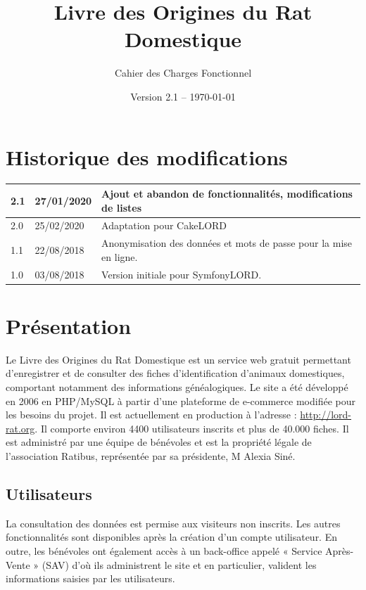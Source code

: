 \documentclass[a4paper,10pt]{article}
\title{Livre des Origines du Rat Domestique}
\author{Cahier des Charges Fonctionnel}
\date{Version 2.1 -- \today}
\begin{document}
\maketitle

\section*{Historique des modifications}

\large
\noindent\begin{tabularx}{\textwidth}{|l|l|X|}\hline
\textbf{2.1} & \textbf{27/01/2020} & \textbf{Ajout et abandon de fonctionnalités, modifications de listes}\\\hline
2.0 & 25/02/2020 & Adaptation pour CakeLORD\\\hline
1.1 & 22/08/2018 & Anonymisation des données et mots de passe pour la mise en ligne.\\\hline
1.0 & 03/08/2018 & Version initiale pour SymfonyLORD.\\\hline
\end{tabularx}
\normalsize

\vfill

\tableofcontents

\section{Présentation}
Le Livre des Origines du Rat Domestique est un service web gratuit permettant d'enregistrer et de consulter des fiches d'identification d'animaux domestiques, comportant notamment des informations généalogiques. Le site a été développé en 2006 en PHP/MySQL à partir d'une plateforme de e-commerce modifiée pour les besoins du projet. Il est actuellement en production à l'adresse : \url{http://lord-rat.org}. Il comporte environ 4400 utilisateurs inscrits et plus de 40.000 fiches. Il est administré par une équipe de bénévoles et est la propriété légale de l'association Ratibus, représentée par sa présidente, M Alexia Siné.

\subsection{Utilisateurs}
La consultation des données est permise aux visiteurs non inscrits. Les autres fonctionnalités sont disponibles après la création d'un compte utilisateur. En outre, les bénévoles ont également accès à un back-office appelé « Service Après-Vente » (SAV) d'où ils administrent le site et en particulier, valident les informations saisies par les utilisateurs.
\end{document}

